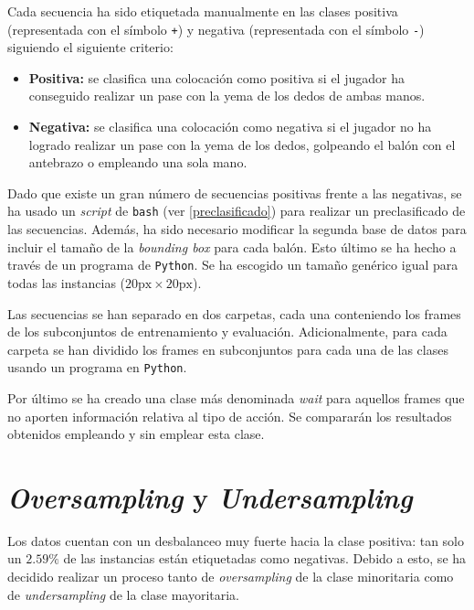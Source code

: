 \documentclass[12pt]{report} %
\begin{document}
    Cada secuencia ha sido etiquetada manualmente en las clases positiva
    (representada con el símbolo \verb!+!) y negativa (representada con el
    símbolo \verb!-!) siguiendo el siguiente criterio:
    \begin{itemize}
        \item \textbf{Positiva:} se clasifica una colocación como positiva si
        el jugador ha conseguido realizar un pase con la yema de los dedos de
        ambas manos.
        \item \textbf{Negativa:} se clasifica una colocación como negativa si
        el jugador no ha logrado realizar un pase con la yema de los dedos,
        golpeando el balón con el antebrazo o empleando una sola mano.
    \end{itemize}
    
    Dado que existe un gran número de secuencias positivas frente a las
    negativas, se ha usado un \textit{script} de \texttt{bash} (ver
    \ref{preclasificado}) para realizar un preclasificado de las secuencias.
    Además, ha sido necesario modificar la segunda base de datos para incluir
    el tamaño de la \textit{bounding box} para cada balón. Esto último se ha
    hecho a través de un programa de \texttt{Python}. Se ha escogido un 
    tamaño genérico igual para todas las instancias ($20\text{px}\times20\text{px}$).

    Las secuencias se han separado en dos carpetas, cada una conteniendo los
    frames de los subconjuntos de entrenamiento y evaluación.
    Adicionalmente, para cada carpeta se han dividido los frames en subconjuntos
    para cada una de las clases usando un programa en \texttt{Python}.

    Por último se ha creado una clase más denominada \textit{wait} para
    aquellos frames que no aporten información relativa al tipo de acción. Se
    compararán los resultados obtenidos empleando y sin emplear esta clase.

    \section{\textit{Oversampling} y \textit{Undersampling}}

    Los datos cuentan con un desbalanceo muy fuerte hacia la clase positiva: tan
    solo un $2.59\%$ de las instancias están etiquetadas como negativas. Debido
    a esto, se ha decidido realizar un proceso tanto de \textit{oversampling} de la clase
    minoritaria como de \textit{undersampling} de la clase mayoritaria. 
\end{document}
